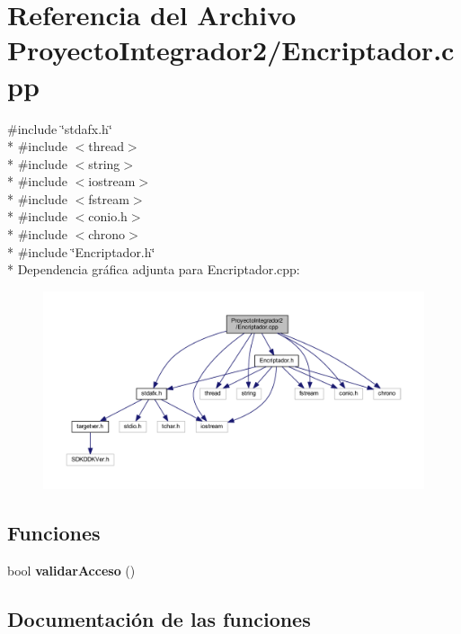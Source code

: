 \section{Referencia del Archivo Proyecto\-Integrador2/\-Encriptador.cpp}
\label{_encriptador_8cpp}
{\ttfamily \#include \char`\"{}stdafx.\-h\char`\"{}}\\*
{\ttfamily \#include $<$thread$>$}\\*
{\ttfamily \#include $<$string$>$}\\*
{\ttfamily \#include $<$iostream$>$}\\*
{\ttfamily \#include $<$fstream$>$}\\*
{\ttfamily \#include $<$conio.\-h$>$}\\*
{\ttfamily \#include $<$chrono$>$}\\*
{\ttfamily \#include \char`\"{}Encriptador.\-h\char`\"{}}\\*
Dependencia gráfica adjunta para Encriptador.\-cpp\-:
\nopagebreak
\begin{figure}[H]
\begin{center}
\leavevmode
\includegraphics[width=350pt]{_encriptador_8cpp__incl}
\end{center}
\end{figure}
\subsection*{Funciones}
\begin{DoxyCompactItemize}
\item 
bool {\bf validar\-Acceso} ()
\end{DoxyCompactItemize}


\subsection{Documentación de las funciones}
